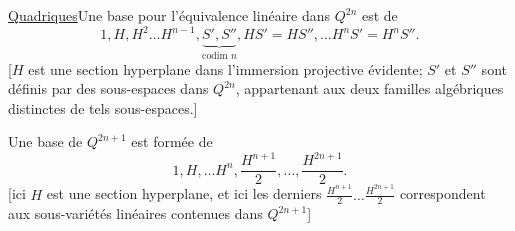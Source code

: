 \uline{Quadriques}\quad Une base pour l'équivalence linéaire dans
$Q^{2n}$ est  de
\[
1,H,H^2\ldots H^{n-1},
\underbrace{S',S''}_{\text{codim }n},
HS'=HS'',\ldots H^nS'=H^nS''.
\]
[$H$ est une section hyperplane dans l'immersion projective évidente;
$S'$ et $S''$ sont définis par des sous-espaces
dans $Q^{2n}$, appartenant aux deux familles algébriques distinctes
de tels sous-espaces.]

Une base de $Q^{2n+1}$ est formée de
\[
1,H,\ldots H^n,\frac{H^{n+1}}2,\ldots,\frac{H^{2n+1}}2.
\]
[ici $H$ est une section hyperplane, et ici les derniers
$\frac{H^{n+1}}2\ldots\frac{H^{2n+1}}2$ correspondent aux sous-variétés
linéaires contenues dans $Q^{2n+1}$]

